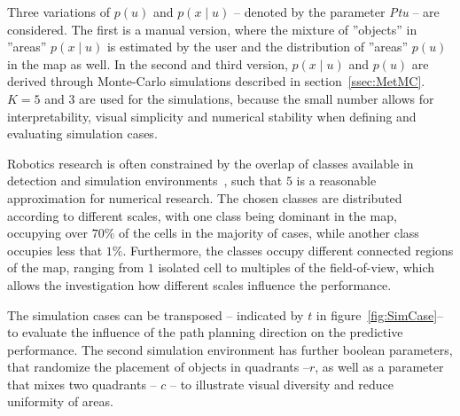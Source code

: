 \documentclass[twocolumn,letterpaper]{IEEEAerospaceCLS}  %
\begin{document}
Three variations of $p(u)$ and $p(x\mid u)$ -- denoted by the parameter \emph{Ptu} -- are considered. The first is a manual version, where the mixture of ''objects'' in ''areas'' $p(x\mid u)$ is estimated by the user and the distribution of ''areas'' $p(u)$ in the map as well. In the second and third version, $p(x\mid u)$ and $p(u)$ are derived through Monte-Carlo simulations described in section~\ref{ssec:MetMC}. $K=5$ and $3$ are used for the simulations, because the small number allows for interpretability, visual simplicity and numerical stability when defining and evaluating simulation cases.

Robotics research is often constrained by the overlap of classes available in detection and simulation environments~\cite{chaplot_object_2020}, such that $5$ is a reasonable approximation for numerical research. The chosen classes are distributed according to different scales, with one class being dominant in the map, occupying over $70$\% of the cells in the majority of cases, while another class occupies less that $1$\%. Furthermore, the classes occupy different connected regions of the map, ranging from $1$ isolated cell to multiples of the field-of-view, which allows the investigation how different scales influence the performance.

The simulation cases can be transposed -- indicated by $t$ in figure~\ref{fig:SimCase}-- to evaluate the influence of the path planning direction on the predictive performance. The second simulation environment has further boolean parameters, that randomize the placement of objects in quadrants --$r$, as well as a parameter that mixes two quadrants -- $c$ -- to illustrate visual diversity and reduce uniformity of areas.
\end{document}
